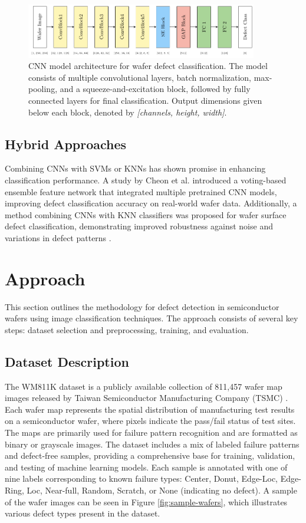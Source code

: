 \documentclass[conference]{IEEEtran}
\begin{document}
\begin{figure}[t]
    \centering
    \includegraphics[width=0.9\textwidth]{assets/cnn-model.pdf}
    \caption{CNN model architecture for wafer defect classification. The model consists of multiple convolutional layers, batch normalization, max-pooling, and a squeeze-and-excitation block, followed by fully connected layers for final classification. Output dimensions given below each block, denoted by \textit{[channels, height, width]}.}
    \label{fig:cnn-model}
\end{figure}

\subsection{Hybrid Approaches}
Combining CNNs with SVMs or KNNs has shown promise in enhancing classification performance. 
A study by Cheon et al. \cite{rw6} introduced a voting-based ensemble feature network that integrated multiple pretrained CNN models, improving defect classification accuracy on real-world wafer data. 
Additionally, a method combining CNNs with KNN classifiers was proposed for wafer surface defect classification, demonstrating improved robustness against noise and variations in defect patterns \cite{rw7}.

\section{Approach} 
This section outlines the methodology for defect detection in semiconductor wafers using image classification techniques.
The approach consists of several key steps: dataset selection and preprocessing, training, and evaluation.

\subsection{Dataset Description}
The WM811K dataset is a publicly available collection of 811,457 wafer map images released by Taiwan Semiconductor Manufacturing Company (TSMC) \cite{b2}. 
Each wafer map represents the spatial distribution of manufacturing test results on a semiconductor wafer, where pixels indicate the pass/fail status of test sites. 
The maps are primarily used for failure pattern recognition and are formatted as binary or grayscale images. 
The dataset includes a mix of labeled failure patterns and defect-free samples, providing a comprehensive base for training, validation, and testing of machine learning models.
Each sample is annotated with one of nine labels corresponding to known failure types: Center, Donut, Edge-Loc, Edge-Ring, Loc, Near-full, Random, Scratch, or None (indicating no defect). 
A sample of the wafer images can be seen in Figure \ref{fig:sample-wafers}, which illustrates various defect types present in the dataset.
\end{document}
